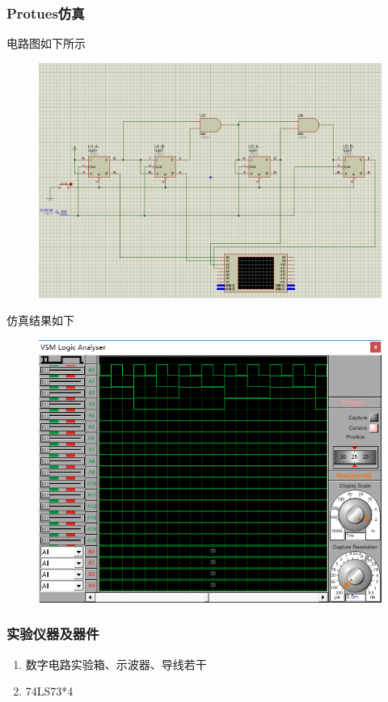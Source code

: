 \documentclass[11pt,UTF8]{ctexart}
\begin{document}
\subsubsection{Protues仿真}
\par 电路图如下所示
\begin{figure}[H]
    \centering
    \includegraphics[width=0.8\linewidth]{fig/16addition_syn.PNG}
\end{figure}
\par 仿真结果如下
\begin{figure}[H]
    \centering
    \includegraphics[width=0.6\linewidth]{fig/16addition_syn_wave.PNG}
\end{figure}

\subsubsection{实验仪器及器件}
\begin{enumerate}
    \item 数字电路实验箱、示波器、导线若干
    \item 74LS73*4
\end{enumerate}
\end{document}
